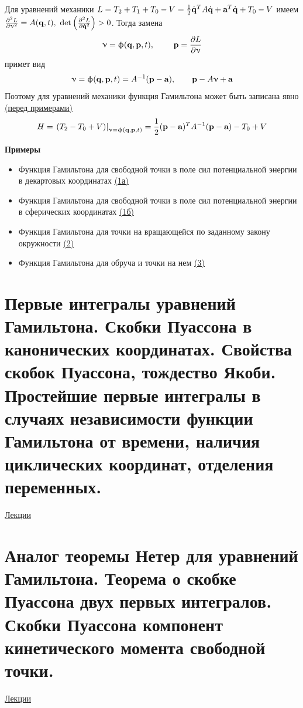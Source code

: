 \documentclass[specialist, subf, href, colorlinks=true, 12pt, times, mtpro, final]{disser}
\theoremstyle{definition}
\def\bfphi{\upphi}
\def\bfnu{\upnu}
\begin{document}
     	Для уравнений механики $L = T_2 + T_1 + T_0 - V = \frac{1}{2}\dot{\mathbf{q}}^T A \dot{\mathbf{q}} + \textbf{a}^T \dot{\mathbf{q}} + T_0 - V$ имеем $\frac{\partial^2 L}{\partial \bfnu^2} = A(\bfq, t), \ \det \left(\frac{\partial^2 L}{\partial \dot{\bfq}^2}\right) > 0$. Тогда замена 
     	$$
     		\bfnu = \bfphi (\bfq, \bfp, t), \ \ \ \ \ \ \ \bfp = \frac{\partial L}{\partial \bfnu}
     	$$
     	примет вид 
     	$$
     	\bfnu = \bfphi (\bfq, \bfp, t) = A^{-1} (\bfp - \textbf{a}), \ \ \ \ \ \ \bfp - A \bfnu + \textbf{a}
     	$$
     	Поэтому для уравнений механики функция Гамильтона может быть записана явно \hyperlink {lects.16}{(перед примерами)}
     	$$
     		H = \left. (T_2 - T_0 + V) \right|_{\bfnu = \bfphi (\bfq, \bfp, t)} = \frac{1}{2}(\bfp - \textbf{a})^T A^{-1} (\bfp - \textbf{a}) - T_0 + V
     	$$
     	
     	\textbf{Примеры}
     	\begin{itemize}
     		\item Функция Гамильтона для свободной точки в поле сил потенциальной энергии в декартовых координатах \hyperlink {lects.16}{(1а)}
     		\item Функция Гамильтона для свободной точки в поле сил потенциальной энергии в сферических координатах \hyperlink {lects.16}{(1б)}
     		\item Функция Гамильтона для точки на вращающейся по заданному закону окружности \hyperlink {lects.16}{(2)}
     		\item Функция Гамильтона для обруча и точки на нем \hyperlink {lects.16}{(3)}
     	\end{itemize}
     	
    \section{Первые интегралы уравнений Гамильтона. Скобки Пуассона в канонических координатах. Свойства скобок Пуассона, тождество Якоби. Простейшие первые интегралы в случаях независимости функции Гамильтона от времени, наличия циклических координат, отделения переменных.}
     \label{14}
    \hyperlink {lects.18}{Лекции} \\
    
    \section{Аналог теоремы Нетер для уравнений Гамильтона. Теорема о скобке Пуассона двух первых интегралов. Скобки Пуассона компонент кинетического момента свободной точки.}
     \label{15}
    \hyperlink {lects.18}{Лекции} \\
    
\end{document}
